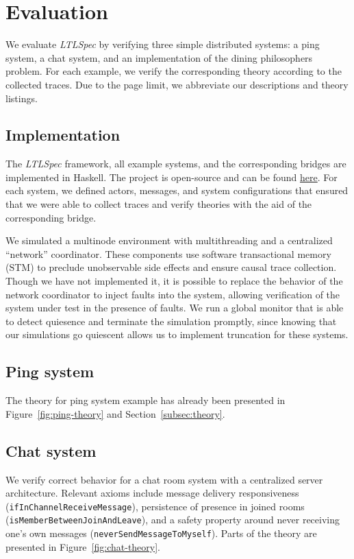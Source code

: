 \documentclass[format=acmsmall, nonacm=true, review=true, screen=true]{acmart}
\newcommand{\ltlspec}{\textit{LTLSpec}\xspace}
\begin{document}
\section{Evaluation}

We evaluate \ltlspec by verifying three simple distributed systems: a ping system, a chat system, and an implementation of the dining philosophers problem. For each example, we verify the corresponding theory according to the collected traces. Due to the page limit, we abbreviate our descriptions and theory listings.

\subsection{Implementation}

The \ltlspec framework, all example systems, and the corresponding bridges are implemented in Haskell.
The project is open-source and can be found \href{https://github.com/ejconlon/ltlspec}{here}.
For each system, we defined actors, messages, and system configurations that ensured that we were able to collect traces and verify theories with the aid of the corresponding bridge.

We simulated a multinode environment with multithreading and a centralized ``network'' coordinator.
These components use software transactional memory (STM) \cite{harris2005composable} to preclude unobservable side effects and ensure causal trace collection.
Though we have not implemented it, it is possible to replace the behavior of the network coordinator to inject faults into the system, allowing verification of the system under test in the presence of faults.
We run a global monitor that is able to detect quiesence and terminate the simulation promptly, since knowing that our simulations go quiescent allows us to implement truncation for these systems.

\subsection{Ping system}

The theory for ping system example has already been presented in Figure~\ref{fig:ping-theory} and Section~\ref{subsec:theory}.

\subsection{Chat system}

We verify correct behavior for a chat room system with a centralized server architecture.
Relevant axioms include message delivery responsiveness (\texttt{ifInChannelReceiveMessage}), persistence of presence in joined rooms (\texttt{isMemberBetweenJoinAndLeave}), and a safety property around never receiving one's own messages (\texttt{neverSendMessageToMyself}). Parts of the theory are presented in Figure~\ref{fig:chat-theory}.
\end{document}
